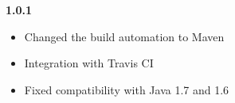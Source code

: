 \textbf{1.0.1}
\begin{itemize}
	\renewcommand{\labelitemi}{$\bullet$}
	\item Changed the build automation to Maven
	\item Integration with Travis CI
	\item Fixed compatibility with Java 1.7 and 1.6
\end{itemize}









